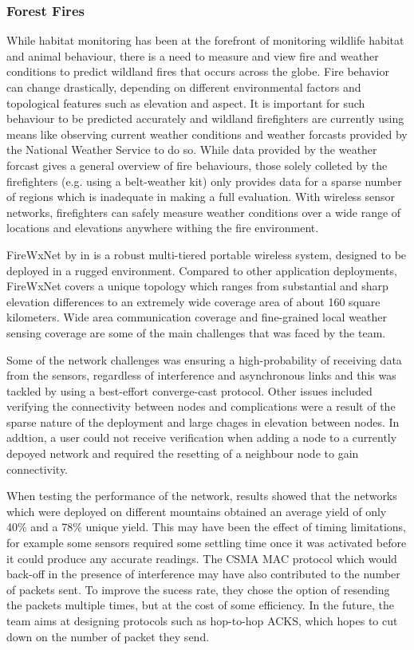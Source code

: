 \subsubsection*{Forest Fires}
\cite{libeliumForestFires}
\cite{FireWxNet}
\cite{4428702}

While habitat monitoring has been at the forefront of monitoring wildlife habitat and animal behaviour, there is a need to measure and view fire and weather conditions to predict wildland fires that occurs across the globe. Fire behavior can change drastically, depending on different environmental factors and topological features such as elevation and aspect. It is important for such behaviour to be predicted accurately and wildland firefighters are currently using means like observing current weather conditions and weather forcasts provided by the  National Weather Service to do so. While data provided by the weather forcast gives a general overview of fire behaviours, those solely colleted by the firefighters (e.g. using a belt-weather kit) only provides data for a sparse number of regions which is inadequate in making a full evaluation. With wireless sensor networks, firefighters can safely measure weather conditions over a wide range of locations and elevations anywhere withing the fire environment.

FireWxNet by \citeauthor{FireWxNet} in \cite{FireWxNet} is a robust multi-tiered portable wireless system, designed to be deployed in a rugged environment. Compared to other application deployments, FireWxNet covers a unique topology which ranges from substantial and sharp elevation differences to an extremely wide coverage area of about 160 square kilometers. Wide area communication coverage and fine-grained local weather sensing coverage are some of the main challenges that was faced by the team. 

Some of the network challenges was ensuring a high-probability of receiving data from the sensors, regardless of interference and asynchronous links and this was tackled by using a best-effort converge-cast protocol. Other issues included verifying the connectivity between nodes and complications were a result of the sparse nature of the deployment and large chages in elevation between nodes. In addtion, a user could not receive verification when adding a node to a currently depoyed network and required the resetting of a neighbour node to gain connectivity.

When testing the performance of the network, results showed that the networks which were deployed on different mountains obtained an average yield of only 40\% and a 78\% unique yield. This may have been the effect of timing limitations, for example some sensors required some settling time once it was activated before it could produce any accurate readings. The CSMA MAC protocol which would back-off in the presence of interference may have also contributed to the number of packets sent. To improve the sucess rate, they chose the option of resending the packets multiple times, but at the cost of some efficiency. In the future, the team aims at designing protocols such as hop-to-hop ACKS, which hopes to cut down on the number of packet they send. 

